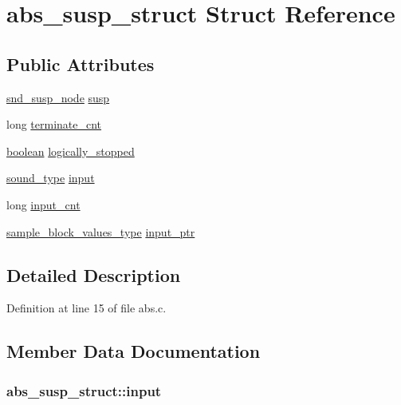 \hypertarget{structabs__susp__struct}{}\section{abs\+\_\+susp\+\_\+struct Struct Reference}
\label{structabs__susp__struct}
\subsection*{Public Attributes}
\begin{DoxyCompactItemize}
\item 
\hyperlink{sound_8h_a6b268203688a934bd798ceb55f85d4c0}{snd\+\_\+susp\+\_\+node} \hyperlink{structabs__susp__struct_a2a56a687d8eb6ff532540cf82ee5f1dc}{susp}
\item 
long \hyperlink{structabs__susp__struct_af34d90c1c97bef541d85523ca7056cc9}{terminate\+\_\+cnt}
\item 
\hyperlink{cext_8h_a7670a4e8a07d9ebb00411948b0bbf86d}{boolean} \hyperlink{structabs__susp__struct_a09153aa9a52315aa16b6caaa47b38072}{logically\+\_\+stopped}
\item 
\hyperlink{sound_8h_a792cec4ed9d6d636d342d9365ba265ea}{sound\+\_\+type} \hyperlink{structabs__susp__struct_ad318027832b5dd0cf5d4e36470cdd92a}{input}
\item 
long \hyperlink{structabs__susp__struct_a89f09e1092647dff3969adf328660aec}{input\+\_\+cnt}
\item 
\hyperlink{sound_8h_a83d17f7b465d1591f27cd28fc5eb8a03}{sample\+\_\+block\+\_\+values\+\_\+type} \hyperlink{structabs__susp__struct_aac436a4053ee94ebbfd1ddbfe98f8ee9}{input\+\_\+ptr}
\end{DoxyCompactItemize}


\subsection{Detailed Description}


Definition at line 15 of file abs.\+c.



\subsection{Member Data Documentation}
\subsubsection[{\texorpdfstring{input}{input}}]{ abs\+\_\+susp\+\_\+struct\+::input}\hypertarget{structabs__susp__struct_ad318027832b5dd0cf5d4e36470cdd92a}{}\label{structabs__susp__struct_ad318027832b5dd0cf5d4e36470cdd92a}



